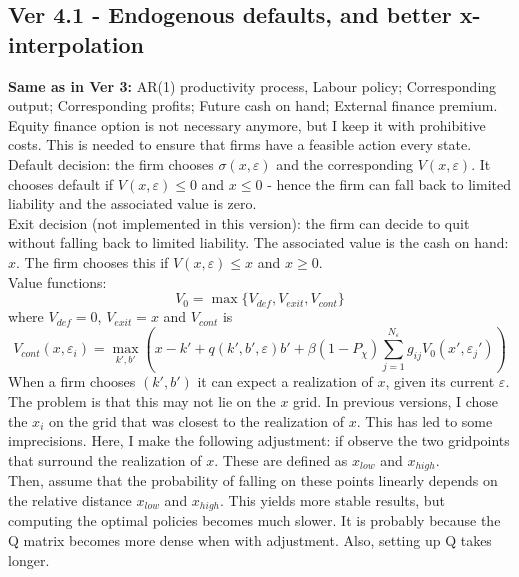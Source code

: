 \documentclass[12pt]{article}
\begin{document}
\subsection*{Ver 4.1 - Endogenous defaults, and better x-interpolation}
\textbf{Same as in Ver 3:} AR(1) productivity process, Labour policy; Corresponding output; Corresponding profits; Future cash on hand; External finance premium. \vspace{3mm} \\
Equity finance option is not necessary anymore, but I keep it with prohibitive costs. This is needed to ensure that firms have a feasible action every state.  \vspace{3mm} \\
Default decision: the firm chooses $\sigma(x, \varepsilon)$ and the corresponding $V(x, \varepsilon)$. It chooses default if $V(x,\varepsilon) \leq 0$ and $x \leq 0$ - hence the firm can fall back to limited liability and the associated value is zero. \vspace{3mm} \\
Exit decision (not implemented in this version): the firm can decide to quit without falling back to limited liability. The associated value is the cash on hand: $x$. The firm chooses this if $V(x, \varepsilon) \leq x$ and $x \geq 0$. \vspace{3mm} \\
Value functions:
\begin{equation}
    V_0 = \max \{ V_{def}, V_{exit}, V_{cont} \}
\end{equation}
where $ V_{def} = 0$, $V_{exit} = x$ and $V_{cont}$ is
\begin{equation}
     V_{cont}(x, \varepsilon_i) = \max_{k',b'}  \left( x - k' +  q(k',b',\varepsilon) b' +
            \beta (1-P_\chi) \sum_{j=1}^{N_\varepsilon} g_{ij}  V_0(x',\varepsilon_j') \right)
\end{equation}
When a firm chooses $(k',b')$ it can expect a realization of $x$, given its current $\varepsilon$. The problem is that this may not lie on the $x$ grid. In previous versions, I chose the $x_i$ on the grid that was closest to the realization of $x$. This has led to some imprecisions. Here, I make the following adjustment: if observe the two gridpoints that surround the realization of $x$. These are defined as $x_{low}$ and $x_{high}$. \vspace{3mm} \\
Then, assume that the probability of falling on these points linearly depends on the relative distance $x_{low}$ and $x_{high}$. This yields more stable results, but computing the optimal policies becomes much slower. It is probably because the Q matrix becomes more dense when with adjustment. Also, setting up Q takes longer.
\end{document}

